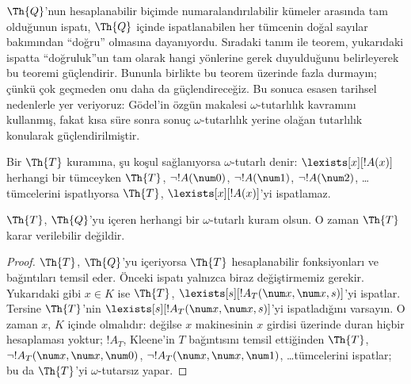 \documentclass[../../../include/open-logic-section]{subfiles}
\begin{document}


\begin{explain}
$\Th{Q}$'nun hesaplanabilir biçimde numaralandırılabilir kümeler arasında
tam olduğunun ispatı, $\Th{Q}$ içinde ispatlanabilen her tümcenin doğal
sayılar bakımından “doğru” olmasına dayanıyordu. Sıradaki tanım ile teorem,
yukarıdaki ispatta “doğruluk”un tam olarak hangi yönlerine gerek
duyulduğunu belirleyerek bu teoremi güçlendirir. Bununla birlikte bu teorem
üzerinde fazla durmayın; çünkü çok geçmeden onu daha da güçlendireceğiz. Bu
sonuca esasen tarihsel nedenlerle yer veriyoruz: G\"odel'in özgün makalesi
$\omega$-tutarlılık kavramını kullanmış, fakat kısa süre sonra sonuç
$\omega$-tutarlılık yerine olağan tutarlılık konularak güçlendirilmiştir.
\end{explain}

\begin{defn}
Bir $\Th{T}$ kuramına, şu koşul sağlanıyorsa $\omega$-tutarlı denir:
$\lexists[x][!A(x)]$ herhangi bir tümceyken $\Th{T}$,
$\lnot !A(\num 0)$, $\lnot !A(\num 1)$, $\lnot !A(\num 2)$, \dots
tümcelerini ispatlıyorsa $\Th{T}$, $\lexists[x][!A(x)]$'yi ispatlamaz.
\end{defn}

\begin{thm}
  $\Th{T}$, $\Th{Q}$'yu içeren herhangi bir $\omega$-tutarlı kuram olsun.
  O zaman $\Th{T}$ karar verilebilir değildir.
\end{thm}

\begin{proof}
$\Th{T}$, $\Th{Q}$'yu içeriyorsa $\Th{T}$ hesaplanabilir fonksiyonları ve
bağıntıları temsil eder. Önceki ispatı yalnızca biraz değiştirmemiz gerekir.
Yukarıdaki gibi $x \in K$ ise $\Th{T}$,
$\lexists[s][!A_T(\num x,\num x, s)]$'yi ispatlar. Tersine $\Th{T}$'nin
$\lexists[s][!A_T(\num x, \num x, s)]$'yi ispatladığını varsayın. O zaman
$x$, $K$ içinde olmalıdır: değilse $x$ makinesinin $x$ girdisi üzerinde
duran hiçbir hesaplaması yoktur; $!A_T$, Kleene'in $T$ bağıntısını temsil
ettiğinden $\Th{T}$, $\lnot !A_T(\num x, \num x, \num 0)$,
$\lnot !A_T(\num x, \num x, \num 1)$, \dots tümcelerini ispatlar; bu da
$\Th{T}$'yi $\omega$-tutarsız yapar.
\end{proof}
\end{document}
